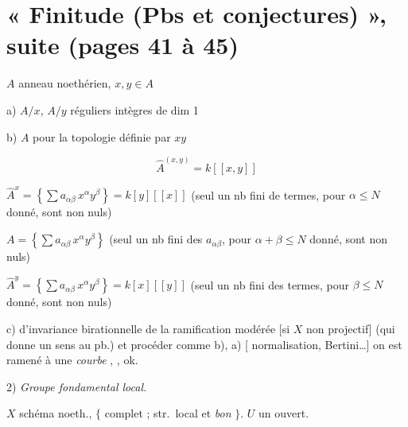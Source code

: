 \documentclass[11pt,a4paper]{article}
\begin{document}
\section*{« Finitude (Pbs et conjectures) », suite (pages 41 à 45)}


$A$ anneau noethérien, $x, y \in A$

a) $A/x$, $A/y$ réguliers intègres de dim 1

b) $A$  \ill{} pour la topologie définie par $xy$


\[ \hat{A}^{(x,y)} = k[[x,y]] \]

$\hat{A}^{x} = \left\{ \sum a_{\alpha\beta}\, x^{\alpha} y^{\beta} \right\} = k[y][[x]]$
(seul un nb fini de termes, pour $\alpha \leq N$ donné, sont non nuls)

$A = \left\{ \sum a_{\alpha\beta}\, x^{\alpha} y^{\beta} \right\}$
(seul un nb fini des $a_{\alpha\beta}$, pour $\alpha + \beta \leq N$ donné,
sont non nuls)

$\hat{A}^{y} = \left\{ \sum a_{\alpha\beta}\, x^{\alpha} y^{\beta} \right\} = k[x][[y]]$
(seul un nb fini des termes, pour $\beta \leq N$ donné, sont non nuls)


c)   d'invariance birationnelle de la
ramification modérée [si $X$ non \struck{\ill{}} projectif] (qui donne un sens
au pb.) et procéder comme b), a) [
normalisation, Bertini\ldots] on est ramené \ill{} à une 
\emph{courbe} \struck{\ill{}}, , ok.

2) \emph{Groupe fondamental local.}

$X$  schéma noeth., $\{$ complet ; str.\ local et \emph{bon} $\}$.
$U$ un ouvert. \ill{}
\end{document}
